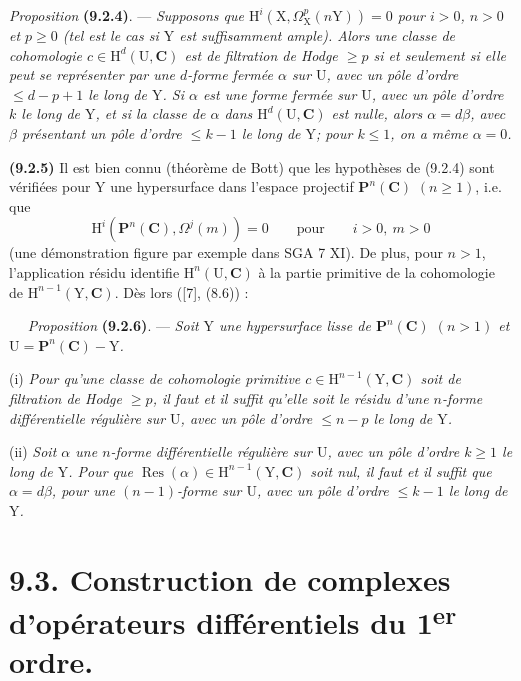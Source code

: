 \documentclass[11pt,leqno]{article}
\newcommand{\Page}[1]{\ifvmode\noindent\else\unskip\ \fi{\footnotesize\textcolor{gray}{[p.\,#1]}}\ \ignorespaces}
\begin{document}
\textit{Proposition} \textbf{(9.2.4)}. — \textit{Supposons que \(\mathrm{H}^{i}(\mathrm{X},\Omega_{\mathrm{X}}^{p}(n\mathrm{Y}))=0\) pour \(i>0\), \(n>0\) et \(p\geq0\) (tel est le cas si \(\mathrm{Y}\) est suffisamment ample). Alors une classe de cohomologie \(c\in\mathrm{H}^{d}(\mathrm{U},\mathbf{C})\) est de filtration de Hodge \(\geq p\) si et seulement si elle peut se représenter par une \(d\)-forme fermée \(\alpha\) sur \(\mathrm{U}\), avec un pôle d’ordre \(\leq d-p+1\) le long de \(\mathrm{Y}\). Si \(\alpha\) est une forme fermée sur \(\mathrm{U}\), avec un pôle d’ordre \(k\) le long de \(\mathrm{Y}\), et si la classe de \(\alpha\) dans \(\mathrm{H}^{d}(\mathrm{U},\mathbf{C})\) est nulle, alors \(\alpha=d\beta\), avec \(\beta\) présentant un pôle d’ordre \(\leq k-1\) le long de \(\mathrm{Y}\); pour \(k\leq1\), on a même \(\alpha=0\).}

\textbf{(9.2.5)} Il est bien connu (théorème de Bott) que les hypothèses de (9.2.4) sont vérifiées pour \(\mathrm{Y}\) une hypersurface dans l’espace projectif \(\mathbf{P}^{n}(\mathbf{C})\) \((n\geq1)\), i.e. que
\[
\mathrm{H}^{i}(\mathbf{P}^{n}(\mathbf{C}),\Omega^{j}(m))=0
\qquad\text{pour}\qquad i>0,\ m>0
\]
(une démonstration figure par exemple dans SGA 7 XI). De plus, pour \(n>1\), l’application résidu identifie \(\mathrm{H}^{n}(\mathrm{U},\mathbf{C})\) à la partie primitive de la cohomologie de \(\mathrm{H}^{n-1}(\mathrm{Y},\mathbf{C})\). Dès lors ([7], (8.6)) :

\Page{50}
\textit{Proposition} \textbf{(9.2.6)}. — \textit{Soit \(\mathrm{Y}\) une hypersurface lisse de \(\mathbf{P}^{n}(\mathbf{C})\) \((n>1)\) et \(\mathrm{U}=\mathbf{P}^{n}(\mathbf{C})-\mathrm{Y}\).}

(i) \textit{Pour qu’une classe de cohomologie primitive \(c\in\mathrm{H}^{n-1}(\mathrm{Y},\mathbf{C})\) soit de filtration de Hodge \(\geq p\), il faut et il suffit qu’elle soit le résidu d’une \(n\)-forme différentielle régulière sur \(\mathrm{U}\), avec un pôle d’ordre \(\leq n-p\) le long de \(\mathrm{Y}\).}

(ii) \textit{Soit \(\alpha\) une \(n\)-forme différentielle régulière sur \(\mathrm{U}\), avec un pôle d’ordre \(k\geq1\) le long de \(\mathrm{Y}\). Pour que \(\operatorname{Res}(\alpha)\in\mathrm{H}^{n-1}(\mathrm{Y},\mathbf{C})\) soit nul, il faut et il suffit que \(\alpha=d\beta\), pour une \((n-1)\)-forme sur \(\mathrm{U}\), avec un pôle d’ordre \(\leq k-1\) le long de \(\mathrm{Y}\).}

\section*{9.3. Construction de complexes d’opérateurs différentiels du 1\textsuperscript{er} ordre.}
\end{document}
